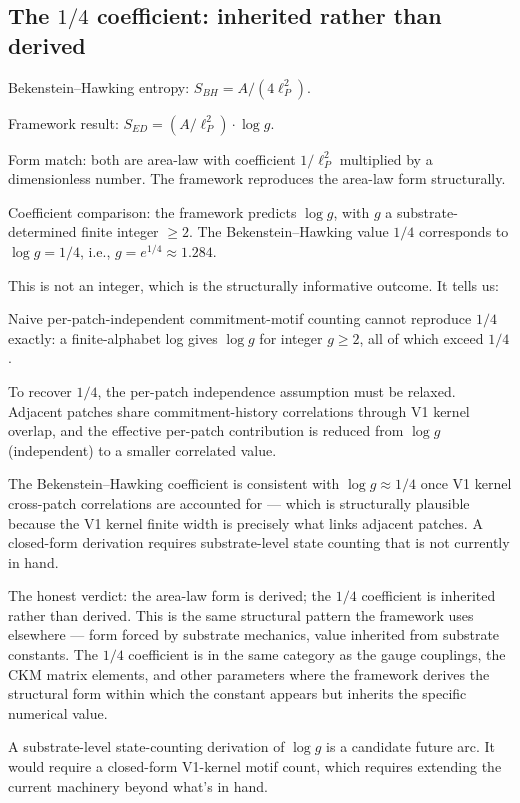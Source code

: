 \documentclass[11pt,a4paper]{article}
\begin{document}
\subsection{The $1/4$ coefficient: inherited rather than derived}

Bekenstein--Hawking entropy: $S_{BH} = A/(4\ell_P^2)$.

Framework result: $S_{ED} = (A/\ell_P^2) \cdot \log g$.

Form match: both are area-law with coefficient $1/\ell_P^2$ multiplied by a dimensionless number. The framework reproduces the area-law form structurally.

Coefficient comparison: the framework predicts $\log g$, with $g$ a substrate-determined finite integer $\geq 2$. The Bekenstein--Hawking value $1/4$ corresponds to $\log g = 1/4$, i.e., $g = e^{1/4} \approx 1.284$.

This is not an integer, which is the structurally informative outcome. It tells us:

Naive per-patch-independent commitment-motif counting cannot reproduce $1/4$ exactly: a finite-alphabet log gives $\log g$ for integer $g \geq 2$, all of which exceed $1/4$.

To recover $1/4$, the per-patch independence assumption must be relaxed. Adjacent patches share commitment-history correlations through V1 kernel overlap, and the effective per-patch contribution is reduced from $\log g$ (independent) to a smaller correlated value.

The Bekenstein--Hawking coefficient is consistent with $\log g \approx 1/4$ once V1 kernel cross-patch correlations are accounted for --- which is structurally plausible because the V1 kernel finite width is precisely what links adjacent patches. A closed-form derivation requires substrate-level state counting that is not currently in hand.

The honest verdict: the area-law form is derived; the $1/4$ coefficient is inherited rather than derived. This is the same structural pattern the framework uses elsewhere --- form forced by substrate mechanics, value inherited from substrate constants. The $1/4$ coefficient is in the same category as the gauge couplings, the CKM matrix elements, and other parameters where the framework derives the structural form within which the constant appears but inherits the specific numerical value.

A substrate-level state-counting derivation of $\log g$ is a candidate future arc. It would require a closed-form V1-kernel motif count, which requires extending the current machinery beyond what's in hand.
\end{document}
